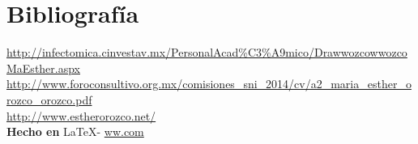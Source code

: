 \documentclass{article}
\begin{document}
\vspace{1cm}

\section*{Bibliograf\'ia}

\noindent \url{http://infectomica.cinvestav.mx/PersonalAcad%C3%A9mico/DrawwozcowwozcoMaEsther.aspx}
\\
\noindent \url{http://www.foroconsultivo.org.mx/comisiones_sni_2014/cv/a2_maria_esther_orozco_orozco.pdf}
\\
\noindent \url{http://www.estherorozco.net/}
\\

\large{\hfill \textbf{Hecho en } \LaTeX - \url{ww.com}}
\end{document}
